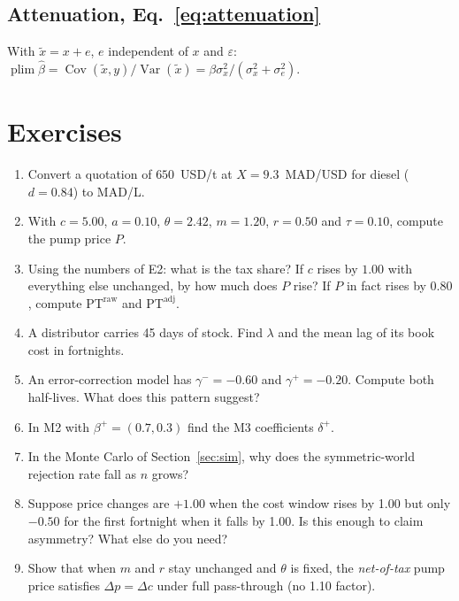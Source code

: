 \documentclass[11pt,a4paper]{article}
\theoremstyle{definition}
\newcommand{\PT}{\mathrm{PT}}
\begin{document}
\subsection{Attenuation, Eq.~\eqref{eq:attenuation}}
With $\tilde x=x+e$, $e$ independent of $x$ and $\varepsilon$: $\operatorname{plim}\hat\beta=\operatorname{Cov}(\tilde x,y)/\operatorname{Var}(\tilde x)=\beta\sigma_x^2/(\sigma_x^2+\sigma_e^2)$.

\section{Exercises}

\begin{enumerate}[label=\textbf{E\arabic*.},leftmargin=2.5em]
\item Convert a quotation of $650$~USD/t at $X=9.3$~MAD/USD for diesel ($d=0.84$) to MAD/L.
\item With $c=5.00$, $a=0.10$, $\theta=2.42$, $m=1.20$, $r=0.50$ and $\tau=0.10$, compute the pump price $P$.
\item Using the numbers of E2: what is the tax share? If $c$ rises by $1.00$ with everything else unchanged, by how much does $P$ rise? If $P$ in fact rises by $0.80$, compute $\PT^{\text{raw}}$ and $\PT^{\text{adj}}$.
\item A distributor carries 45 days of stock. Find $\lambda$ and the mean lag of its book cost in fortnights.
\item An error-correction model has $\gamma^{-}=-0.60$ and $\gamma^{+}=-0.20$. Compute both half-lives. What does this pattern suggest?
\item In M2 with $\beta^{+}=(0.7,0.3)$ find the M3 coefficients $\delta^{+}$.
\item In the Monte Carlo of Section~\ref{sec:sim}, why does the symmetric-world rejection rate fall as $n$ grows?
\item Suppose price changes are $+1.00$ when the cost window rises by 1.00 but only $-0.50$ for the first fortnight when it falls by 1.00. Is this enough to claim asymmetry? What else do you need?
\item Show that when $m$ and $r$ stay unchanged and $\theta$ is fixed, the \emph{net-of-tax} pump price satisfies $\Delta p=\Delta c$ under full pass-through (no 1.10 factor).
\end{enumerate}
\end{document}
